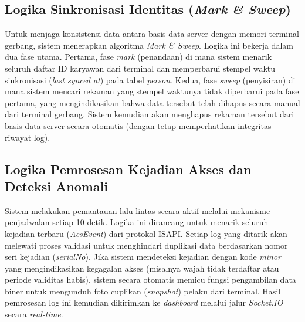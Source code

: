 \subsection{Logika Sinkronisasi Identitas (\textit{Mark \& Sweep})}
Untuk menjaga konsistensi data antara basis data server dengan memori terminal gerbang, sistem menerapkan algoritma \textit{Mark \& Sweep}. Logika ini bekerja dalam dua fase utama. Pertama, fase \textit{mark} (penandaan) di mana sistem menarik seluruh daftar ID karyawan dari terminal dan memperbarui stempel waktu sinkronisasi (\textit{last synced at}) pada tabel \textit{person}. Kedua, fase \textit{sweep} (penyisiran) di mana sistem mencari rekaman yang stempel waktunya tidak diperbarui pada fase pertama, yang mengindikasikan bahwa data tersebut telah dihapus secara manual dari terminal gerbang. Sistem kemudian akan menghapus rekaman tersebut dari basis data server secara otomatis (dengan tetap memperhatikan integritas riwayat log). 

\subsection{Logika Pemrosesan Kejadian Akses dan Deteksi Anomali}
Sistem melakukan pemantauan lalu lintas secara aktif melalui mekanisme penjadwalan setiap 10 detik. Logika ini dirancang untuk menarik seluruh kejadian terbaru (\textit{AcsEvent}) dari protokol ISAPI. Setiap log yang ditarik akan melewati proses validasi untuk menghindari duplikasi data berdasarkan nomor seri kejadian (\textit{serialNo}). Jika sistem mendeteksi kejadian dengan kode \textit{minor} yang mengindikasikan kegagalan akses (misalnya wajah tidak terdaftar atau periode validitas habis), sistem secara otomatis memicu fungsi pengambilan data biner untuk mengunduh foto cuplikan (\textit{snapshot}) pelaku dari terminal. Hasil pemrosesan log ini kemudian dikirimkan ke \textit{dashboard} melalui jalur \textit{Socket.IO} secara \textit{real-time}. 

